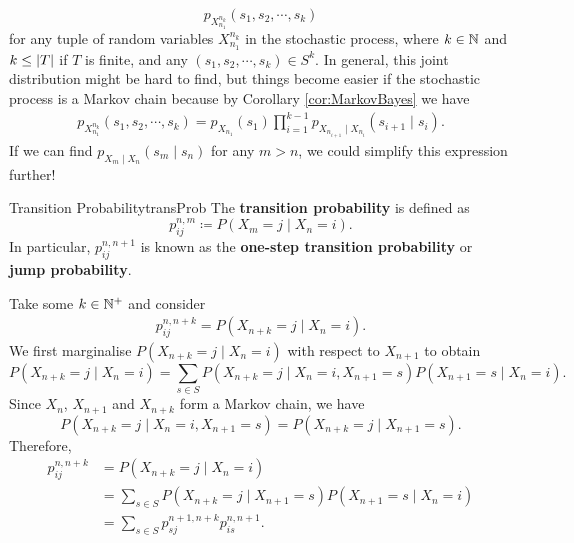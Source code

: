 \documentclass[math, code]{amznotes}
\theoremstyle{remark}
\begin{document}
\begin{equation*}
    p_{X_{n_1}^{n_k}}\left(s_1, s_2, \cdots, s_k\right)
\end{equation*}
for any tuple of random variables $X_{n_1}^{n_k}$ in the stochastic process, where $k \in \mathbb{N}$ and $k \leq {\left\lvert {T} \right\rvert}$ if $T$ is finite, and any $\left(s_1, s_2, \cdots, s_k\right) \in S^k$. In general, this joint distribution might be hard to find, but things become easier if the stochastic process is a Markov chain because by Corollary \ref{cor:MarkovBayes} we have
\begin{align*}
    p_{X_{n_1}^{n_k}}\left(s_1, s_2, \cdots, s_k\right) = p_{X_{n_1}}\left(s_1\right)\prod_{i = 1}^{k - 1}p_{X_{n_{i + 1}} \mid X_{n_i}}\left(s_{i + 1} \mid s_i\right).
\end{align*}
If we can find $p_{X_m \mid X_n}\left(s_m \mid s_n\right)$ for any $m > n$, we could simplify this expression further! 
\begin{dfnbox}{Transition Probability}{transProb}
    The {\color{red} \textbf{transition probability}} is defined as 
    \begin{equation*}
        p_{ij}^{n, m} \coloneqq P\left(X_{m} = j \mid X_n = i\right).
    \end{equation*}
    In particular, $p_{ij}^{n, n + 1}$ is known as the {\color{red} \textbf{one-step transition probability}} or {\color{red} \textbf{jump probability}}.
\end{dfnbox}
Take some $k \in \mathbb{N}^+$ and consider
\begin{align*}
    p_{ij}^{n, n + k} = P\left(X_{n + k} = j \mid X_n = i\right).
\end{align*}
We first marginalise $P\left(X_{n + k} = j \mid X_n = i\right)$ with respect to $X_{n + 1}$ to obtain
\begin{equation*}
    P\left(X_{n + k} = j \mid X_n = i\right) = \sum_{s \in S}P\left(X_{n + k} = j \mid X_n = i, X_{n + 1} = s\right)P\left(X_{n + 1} = s \mid X_n = i\right).
\end{equation*}
Since $X_n$, $X_{n + 1}$ and $X_{n + k}$ form a Markov chain, we have
\begin{equation*}
    P\left(X_{n + k} = j \mid X_n = i, X_{n + 1} = s\right) = P\left(X_{n + k} = j \mid X_{n + 1} = s\right).
\end{equation*}
Therefore, 
\begin{align*}
    p_{ij}^{n, n + k} & = P\left(X_{n + k} = j \mid X_n = i\right) \\
    & = \sum_{s \in S}P\left(X_{n + k} = j \mid X_{n + 1} = s\right)P\left(X_{n + 1} = s \mid X_n = i\right) \\
    & = \sum_{s \in S}p_{sj}^{n + 1, n + k}p_{is}^{n, n + 1}.
\end{align*}
\end{document}
